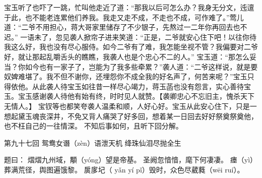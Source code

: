 \documentclass[12pt,oneside]{book}
\begin{document}
宝玉听了也吓了一跳，忙叫他走近了道：“那我以后可怎么办？我身无分文，迍邅于此，也不能老连累他们养我。我走又走不成，不走也不成，可作难了。”莺儿道：“二爷不用担心，蒋大哥家里储存了不少银子，先熬过一二年你再回去也不迟。”
一语未了，忽见袭人掀帘子进来笑道：“正是，二爷就安心住下吧！以往你待我这么好，我也没有尽心服侍。如今二爷有了难，我怎能坐视不管？我偏要对二爷好，就让那起乱嚼舌头的瞧瞧，我袭人也是个忠心不二的人。”
宝玉道：“那怎么妥当？你如今也有一家子了，岂能为了我多些牵累？”袭人道：“二爷这样说，就是要奴婢难堪了。我不但不谢你，还埋怨你不成全我的好名声了，何苦来呢？”宝玉只得依他。从此袭人待宝玉如往昔一样尽心竭力，蒋玉菡也没有怨言，实心善待宝玉。宝玉感谢袭人待他有始有终，时时见人就赞。【袭卿忠心不忘旧主，愧杀天下无情人。】
宝钗等也都笑夸袭人温柔和顺，人好心好。宝玉从此安心住下，只是一想起黛玉魂丧深井，不免又背人痛哭了好多回，想着某一日回去好好祭奠祭奠他，也不枉自己的一往情深。
不知后事如何，且听下回分解。

 
第九十七回 鸳鸯女谮（zèn）语泄天机 绛珠仙泪尽抛全生

题曰：
熠熠九州域，顒（yóng）望是帝基。
圣阙忽愔愔，麾下何凄凄。
瘗（yì）葬满荒径，舆图遍饿黎。
扊扅圮（ yǎn yí pǐ）毁时，众色尽葳蕤（wēi ruí）。
\end{document}
